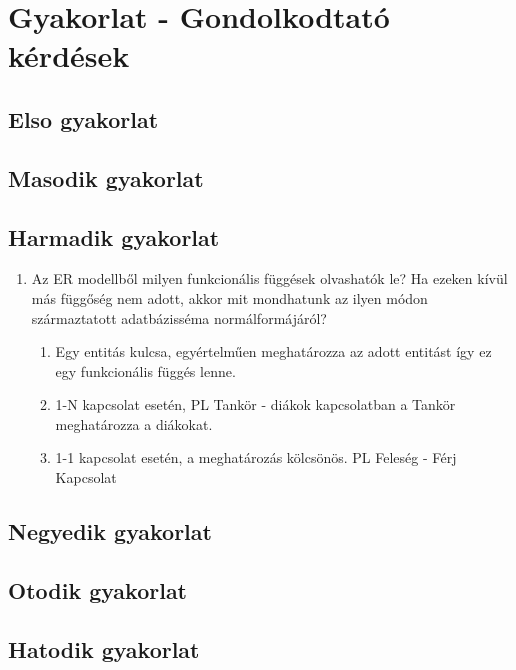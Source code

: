 \section{Gyakorlat - Gondolkodtató kérdések}

\subsection{Elso gyakorlat}

\subsection{Masodik gyakorlat}

\subsection{Harmadik gyakorlat}

	\begin{enumerate}
		\item Az ER modellből milyen funkcionális függések olvashatók le? Ha ezeken kívül más függőség nem adott, akkor mit mondhatunk az ilyen módon származtatott adatbázisséma normálformájáról?

		\begin{enumerate}
			\item Egy entitás kulcsa, egyértelműen meghatározza az adott entitást így ez egy funkcionális függés lenne.
			\item 1-N kapcsolat esetén,  PL Tankör - diákok kapcsolatban a Tankör meghatározza a diákokat.
			\item 1-1 kapcsolat esetén, a meghatározás kölcsönös. PL Feleség - Férj Kapcsolat
		\end{enumerate}


	\end{enumerate}

\subsection{Negyedik gyakorlat}


\subsection{Otodik gyakorlat}

\subsection{Hatodik gyakorlat}


